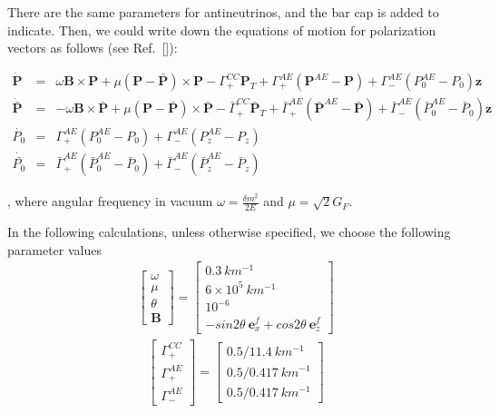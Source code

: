 \documentclass[aps,prd,twocolumn,amsmath,amssymb,groupedaddress]{revtex4-2}
\begin{document}
There are the same parameters for antineutrinos, and the bar cap is added to indicate. Then, we could write down the equations of motion for polarization vectors as follows (see Ref.~[]):
\begin{widetext}
\begin{eqnarray} 
	\dot{\textbf{P}} &=& \omega \textbf{B} \times \textbf{P}+ \mu (\textbf{P}-\bar{\textbf{P}}) \times \textbf{P} - \Gamma^{CC}_+ \textbf{P}_T + \Gamma^{AE}_+ (\textbf{P}^{AE} - \textbf{P}) + \Gamma^{AE}_- (P^{AE}_0 -P_0)\textbf{z} \\
	\dot{\bar{\textbf{P}}} &=& -\omega \textbf{B} \times \bar{\textbf{P}}+ \mu (\textbf{P}-\bar{\textbf{P}}) \times \bar{\textbf{P}} - \bar{\Gamma}^{CC}_+ \bar{\textbf{P}}_T + \bar{\Gamma}^{AE}_+ (\bar{\textbf{P}}^{AE} - \bar{\textbf{P}}) + \bar{\Gamma}^{AE}_- (\bar{P}^{AE}_0 -\bar{P}_0)\textbf{z} \\
	\dot{P_0} &=& \Gamma^{AE}_+ (P^{AE}_0 -P_0) + \Gamma^{AE}_- (P^{AE}_z -P_z) \\
	\dot{\bar{P_0}} &=& \bar{\Gamma}^{AE}_+ (\bar{P}^{AE}_0 -\bar{P}_0) + \bar{\Gamma}^{AE}_- (\bar{P}^{AE}_z -\bar{P}_z)
\end{eqnarray}
\end{widetext}
, where angular frequency in vacuum $\omega = \frac{\delta m^2}{2E}$ and $\mu = \sqrt{2} G_F$.

In the following calculations, unless otherwise specified, we choose the following parameter values
\begin{eqnarray}
	\label{equ:par_constant}
	\begin{bmatrix}
		\omega \\ 
		\mu \\ 
		\theta\\
		\textbf{B}
	\end{bmatrix}
	= \begin{bmatrix}
		0.3 ~km^{-1} \\ 
		6 \times 10^5 ~km^{-1} \\ 
		10^{-6} \\
		-sin 2\theta~\textbf{e}_x^f + cos 2\theta~\textbf{e}_z^f 
	\end{bmatrix}
\end{eqnarray}
\begin{eqnarray}
	\label{equ:par_gamma}
	\begin{bmatrix}
		\Gamma^{CC}_+ \\ \Gamma^{AE}_+ \\ \Gamma^{AE}_-
	\end{bmatrix}
	= \begin{bmatrix}
		0.5/11.4 ~km^{-1} \\ 0.5/0.417 ~km^{-1} \\ 0.5/0.417 ~km^{-1}
	\end{bmatrix}
\end{eqnarray}
\end{document}
